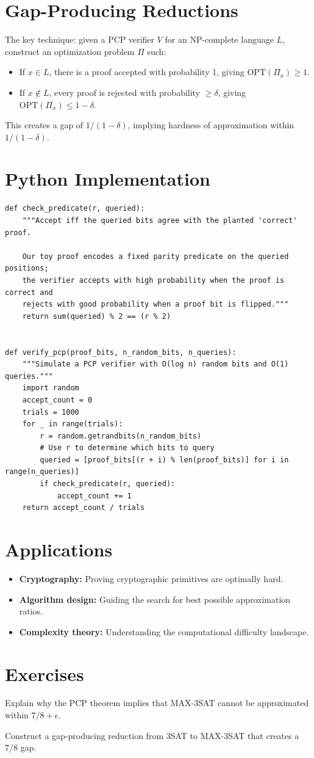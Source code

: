 \section{Gap-Producing Reductions}
The key technique: given a PCP verifier $V$ for an NP-complete language $L$, construct an optimization problem $\Pi$ such:
\begin{itemize}
    \item If $x \in L$, there is a proof accepted with probability 1, giving $\text{OPT}(\Pi_x) \ge 1$.
    \item If $x \notin L$, every proof is rejected with probability $\ge \delta$, giving $\text{OPT}(\Pi_x) \le 1 - \delta$.
\end{itemize}
This creates a gap of $1/(1-\delta)$, implying hardness of approximation within $1/(1-\delta)$.

\section{Python Implementation}

\begin{lstlisting}[style=python, caption=PCP Verifier Simulation]
def check_predicate(r, queried):
    """Accept iff the queried bits agree with the planted 'correct' proof.

    Our toy proof encodes a fixed parity predicate on the queried positions;
    the verifier accepts with high probability when the proof is correct and
    rejects with good probability when a proof bit is flipped."""
    return sum(queried) % 2 == (r % 2)


def verify_pcp(proof_bits, n_random_bits, n_queries):
    """Simulate a PCP verifier with O(log n) random bits and O(1) queries."""
    import random
    accept_count = 0
    trials = 1000
    for _ in range(trials):
        r = random.getrandbits(n_random_bits)
        # Use r to determine which bits to query
        queried = [proof_bits[(r + i) % len(proof_bits)] for i in range(n_queries)]
        if check_predicate(r, queried):
            accept_count += 1
    return accept_count / trials
\end{lstlisting}

\section{Applications}
\begin{itemize}
    \item \textbf{Cryptography:} Proving cryptographic primitives are optimally hard.
    \item \textbf{Algorithm design:} Guiding the search for best possible approximation ratios.
    \item \textbf{Complexity theory:} Understanding the computational difficulty landscape.
\end{itemize}

\section{Exercises}
\begin{exercise}
Explain why the PCP theorem implies that MAX-3SAT cannot be approximated within $7/8 + \epsilon$.
\end{exercise}
\begin{exercise}
Construct a gap-producing reduction from 3SAT to MAX-3SAT that creates a $7/8$ gap.
\end{exercise}

